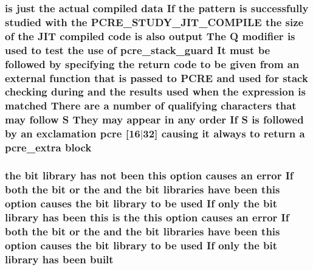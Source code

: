 \subsubsection[{\texorpdfstring{block}{block}}]{ {\bf is} just the actual {\bf compiled} {\bf data} If the {\bf pattern} {\bf is} successfully {\bf studied} {\bf with} the {\bf P\+C\+R\+E\+\_\+\+S\+T\+U\+D\+Y\+\_\+\+J\+I\+T\+\_\+\+C\+O\+M\+P\+I\+LE} the {\bf size} {\bf of} the J\+IT {\bf compiled} {\bf code} {\bf is} also {\bf output} The Q {\bf modifier} {\bf is} {\bf used} {\bf to} test the use {\bf of} {\bf pcre\+\_\+stack\+\_\+guard} It must {\bf be} followed by {\bf specifying} the return {\bf code} {\bf to} {\bf be} {\bf given} {\bf from} an external {\bf function} that {\bf is} passed {\bf to} {\bf P\+C\+RE} and {\bf used} for {\bf stack} checking during and the {\bf results} {\bf used} when the {\bf expression} {\bf is} {\bf matched} There {\bf are} {\bf a} {\bf number} {\bf of} qualifying {\bf characters} that may follow {\bf S} They may appear {\bf in} {\bf any} {\bf order} If {\bf S} {\bf is} followed by an exclamation {\bf pcre} \mbox{[}16$\vert$32\mbox{]} causing {\bf it} always {\bf to} return {\bf a} {\bf pcre\+\_\+extra} block}\hypertarget{pcretest_8txt_aebde0006968e3c574305c604c927277a}{}\label{pcretest_8txt_aebde0006968e3c574305c604c927277a}
\subsubsection[{\texorpdfstring{built}{built}}]{ the {\bf bit} {\bf library} has {\bf not} been {\bf this} {\bf option} causes an {\bf error} If both the {\bf bit} {\bf or} the and the {\bf bit} {\bf libraries} have been {\bf this} {\bf option} causes the {\bf bit} {\bf library} {\bf to} {\bf be} {\bf used} If only the {\bf bit} {\bf library} has been {\bf this} {\bf is} the {\bf this} {\bf option} causes an {\bf error} If both the {\bf bit} {\bf or} the and the {\bf bit} {\bf libraries} have been {\bf this} {\bf option} causes the {\bf bit} {\bf library} {\bf to} {\bf be} {\bf used} If only the {\bf bit} {\bf library} has been built}\hypertarget{pcretest_8txt_a441b0f5d179bd730727fd325dfe75401}{}\label{pcretest_8txt_a441b0f5d179bd730727fd325dfe75401}
